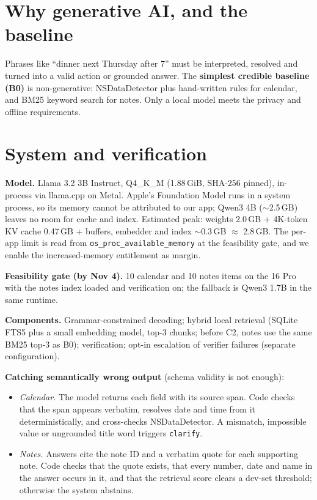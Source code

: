 \documentclass[10pt,letterpaper]{article}
\begin{document}
\section{Why generative AI, and the baseline}
Phrases like ``dinner next Thursday after 7'' must be interpreted, resolved and turned into a valid action or grounded answer. The \textbf{simplest credible baseline (B0)} is non-generative: NSDataDetector plus hand-written rules for calendar, and BM25 keyword search for notes. Only a local model meets the privacy and offline requirements.

\section{System and verification}
\textbf{Model.} Llama 3.2 3B Instruct, Q4\_K\_M (1.88\,GiB, SHA-256 pinned), in-process via llama.cpp on Metal. Apple's Foundation Model runs in a system process, so its memory cannot be attributed to our app; Qwen3 4B ($\sim$2.5\,GB) leaves no room for cache and index. Estimated peak: weights 2.0\,GB + 4K-token KV cache 0.47\,GB + buffers, embedder and index $\sim$0.3\,GB $\approx$ 2.8\,GB. The per-app limit is read from \texttt{os\_proc\_available\_memory} at the feasibility gate, and we enable the increased-memory entitlement as margin.

\textbf{Feasibility gate (by Nov 4).} 10 calendar and 10 notes items on the 16 Pro with the notes index loaded and verification on; the fallback is Qwen3 1.7B in the same runtime.

\textbf{Components.} Grammar-constrained decoding; hybrid local retrieval (SQLite FTS5 plus a small embedding model, top-3 chunks; before C2, notes use the same BM25 top-3 as B0); verification; opt-in escalation of verifier failures (separate configuration).

\textbf{Catching semantically wrong output} (schema validity is not enough):
\begin{itemize}
  \item \textit{Calendar.} The model returns each field with its source span. Code checks that the span appears verbatim, resolves date and time from it deterministically, and cross-checks NSDataDetector. A mismatch, impossible value or ungrounded title word triggers \texttt{clarify}.
  \item \textit{Notes.} Answers cite the note ID and a verbatim quote for each supporting note. Code checks that the quote exists, that every number, date and name in the answer occurs in it, and that the retrieval score clears a dev-set threshold; otherwise the system abstains.
\end{itemize}
\end{document}
